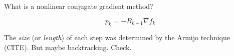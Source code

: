 What is a nonlinear conjugate gradient method?

\begin{equation}
p_k = -B_{k-1}\nabla f_k
\end{equation}

The \emph{size} (or \emph{length}) of each step was determined by the 
Armijo technique (CITE).  But maybe backtracking. Check.





